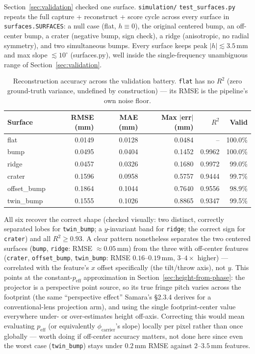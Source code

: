 \documentclass[11pt]{article}
\begin{document}
Section~\ref{sec:validation} checked one surface. \texttt{simulation/}
\texttt{test\_surfaces.py} repeats the full capture + reconstruct +
score cycle across every surface in \texttt{surfaces.SURFACES}: a null
case (flat, $h\equiv0$), the original centered bump, an off-center bump,
a crater (negative bump, sign check), a ridge (anisotropic, no radial
symmetry), and two simultaneous bumps. Every surface keeps peak
$|h|\lesssim3.5$\,mm and max slope $\lesssim10^\circ$ (surfaces.py), well
inside the single-frequency unambiguous range of
Section~\ref{sec:validation}.

\begin{table}[h]
\centering
\begin{tabular}{@{}lrrrrr@{}}
\toprule
Surface & RMSE (mm) & MAE (mm) & Max $|$err$|$ (mm) & $R^2$ & Valid \\
\midrule
flat        & 0.0149 & 0.0128 & 0.0484 & --     & 100.0\% \\
bump        & 0.0495 & 0.0404 & 0.1452 & 0.9962 & 100.0\% \\
ridge       & 0.0457 & 0.0326 & 0.1680 & 0.9972 & 99.0\%  \\
crater      & 0.1596 & 0.0958 & 0.5757 & 0.9444 & 99.7\%  \\
offset\_bump & 0.1864 & 0.1044 & 0.7640 & 0.9556 & 98.9\%  \\
twin\_bump   & 0.1555 & 0.1026 & 0.8865 & 0.9347 & 99.5\%  \\
\bottomrule
\end{tabular}
\caption{Reconstruction accuracy across the validation battery.
\texttt{flat} has no $R^2$ (zero ground-truth variance, undefined by
construction) --- its RMSE is the pipeline's own noise floor.}
\end{table}

All six recover the correct shape (checked visually: two distinct,
correctly separated lobes for \texttt{twin\_bump}; a $y$-invariant band
for \texttt{ridge}; the correct sign for \texttt{crater}) and all $R^2
\geq 0.93$. A clear pattern nonetheless separates the two centered
surfaces (\texttt{bump}, \texttt{ridge}: RMSE $\approx0.05$\,mm) from the
three with off-center features (\texttt{crater}, \texttt{offset\_bump},
\texttt{twin\_bump}: RMSE $0.16$--$0.19$\,mm, $3$--$4\times$ higher) ---
correlated with the feature's $x$ offset specifically (the tilt/throw
axis), not $y$. This points at the constant-$p_{\text{eff}}$
approximation in Section~\ref{sec:height-from-phase}: the projector is a
perspective point source, so its true fringe pitch varies across the
footprint (the same ``perspective effect'' Samara's \S2.3.4 derives for a
conventional-lens projection arm), and using the single footprint-center
value everywhere under- or over-estimates height off-axis. Correcting
this would mean evaluating $p_{\text{eff}}$ (or equivalently $\phi_
{\text{carrier}}$'s slope) locally per pixel rather than once globally ---
worth doing if off-center accuracy matters, not done here since even the
worst case (\texttt{twin\_bump}) stays under $0.2$\,mm RMSE against
$2$--$3.5$\,mm features.
\end{document}
